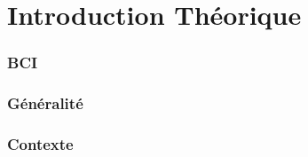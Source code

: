 \part{Introduction Théorique} %
\label{prt:introduction_ _théorique_}
	
	\section{BCI} %
	\label{sec:bci}
	

	\section{Généralité} %
	\label{sec:généralité}
	

	\section{Contexte} %
	\label{sec:contexte}

